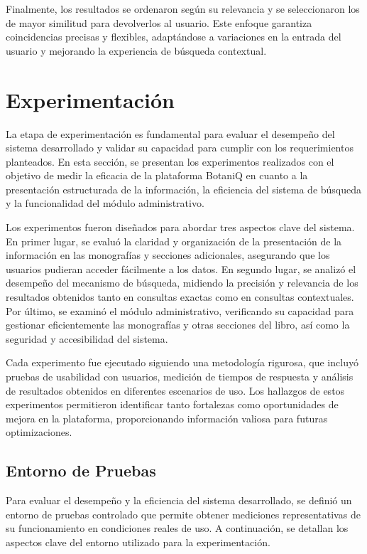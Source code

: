 Finalmente, los resultados se ordenaron según su relevancia y se seleccionaron los de mayor similitud para devolverlos al usuario. Este enfoque garantiza coincidencias precisas y flexibles, adaptándose a variaciones en la entrada del usuario 
y mejorando la experiencia de búsqueda contextual.



\section{Experimentación}
La etapa de experimentación es fundamental para evaluar el desempeño del sistema desarrollado 
y validar su capacidad para cumplir con los requerimientos planteados. En esta sección, se 
presentan los experimentos realizados con el objetivo de medir la eficacia de la plataforma 
BotaniQ en cuanto a la presentación estructurada de la información, la eficiencia del sistema 
de búsqueda y la funcionalidad del módulo administrativo.

Los experimentos fueron diseñados para abordar tres aspectos clave del sistema. En primer lugar, 
se evaluó la claridad y organización de la presentación de la información en las monografías 
y secciones adicionales, asegurando que los usuarios pudieran acceder fácilmente a los datos. 
En segundo lugar, se analizó el desempeño del mecanismo de búsqueda, midiendo la precisión y 
relevancia de los resultados obtenidos tanto en consultas exactas como en consultas contextuales. 
Por último, se examinó el módulo administrativo, verificando su capacidad para gestionar 
eficientemente las monografías y otras secciones del libro, así como la seguridad y accesibilidad 
del sistema.

Cada experimento fue ejecutado siguiendo una metodología rigurosa, que incluyó pruebas de usabilidad 
con usuarios, medición de tiempos de respuesta y análisis de resultados obtenidos en diferentes 
escenarios de uso. Los hallazgos de estos experimentos permitieron identificar tanto fortalezas 
como oportunidades de mejora en la plataforma, proporcionando información valiosa para futuras optimizaciones.

\subsection{Entorno de Pruebas}
Para evaluar el desempeño y la eficiencia del sistema desarrollado, se definió un entorno de pruebas controlado 
que permite obtener mediciones representativas de su funcionamiento en condiciones reales de uso. A continuación, 
se detallan los aspectos clave del entorno utilizado para la experimentación.

